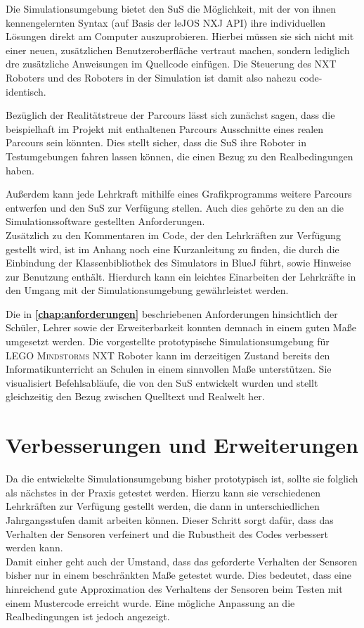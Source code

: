\documentclass[paper=a4, DIV=calc, BCOR=12mm, twoside=on, onecolumn=on, open = right, titlepage =on, parskip =half-, headsepline = on, footsepline = off, chapterprefix = off, appendixprefix = on, fontsize = 12pt, numbers = noenddot, abstract = on]{scrbook}
\begin{document}
Die Simulationsumgebung bietet den SuS die Möglichkeit, mit der von ihnen kennengelernten Syntax (auf Basis der leJOS NXJ API) ihre individuellen Lösungen direkt am Computer auszuprobieren. Hierbei müssen sie sich nicht mit einer neuen, zusätzlichen Benutzeroberfläche vertraut machen, sondern lediglich dre zusätzliche Anweisungen im Quellcode einfügen. Die Steuerung des NXT Roboters und des Roboters in der Simulation ist damit also nahezu code-identisch.

Bezüglich der Realitätstreue der Parcours lässt sich zunächst sagen, dass die beispielhaft im Projekt mit enthaltenen Parcours Ausschnitte eines realen Parcours sein könnten. Dies stellt sicher, dass die SuS ihre Roboter in Testumgebungen fahren lassen können, die einen Bezug zu den Realbedingungen haben.

Außerdem kann jede Lehrkraft mithilfe eines Grafikprogramms weitere Parcours entwerfen und den SuS zur Verfügung stellen. Auch dies gehörte zu den an die Simulationssoftware gestellten Anforderungen.\\ 
Zusätzlich zu den Kommentaren im Code, der den Lehrkräften zur Verfügung gestellt wird, ist im Anhang noch eine Kurzanleitung zu finden, die durch die Einbindung der Klassenbibliothek des Simulators in BlueJ führt, sowie Hinweise zur Benutzung enthält. Hierdurch kann ein leichtes Einarbeiten der Lehrkräfte in den Umgang mit der Simulationsumgebung gewährleistet werden. 

Die in \textbf{\ref{chap:anforderungen}} beschriebenen Anforderungen hinsichtlich der Schüler, Lehrer sowie der Erweiterbarkeit konnten demnach in einem guten Maße umgesetzt werden. Die vorgestellte prototypische Simulationsumgebung für \textsc{LEGO Mindstorms} NXT Roboter kann im derzeitigen Zustand bereits den Informatikunterricht an Schulen in einem sinnvollen Maße unterstützen. Sie visualisiert Befehlsabläufe, die von den SuS entwickelt wurden und stellt gleichzeitig den Bezug zwischen Quelltext und Realwelt her. 

\section{Verbesserungen und Erweiterungen}

Da die entwickelte Simulationsumgebung bisher prototypisch ist, sollte sie folglich als nächstes in der Praxis getestet werden. Hierzu kann sie verschiedenen Lehrkräften zur Verfügung gestellt werden, die dann in unterschiedlichen Jahrgangsstufen damit arbeiten können. Dieser Schritt sorgt dafür, dass das Verhalten der Sensoren verfeinert und die Rubustheit des Codes verbessert werden kann.\\
Damit einher geht auch der Umstand, dass das geforderte Verhalten der Sensoren bisher nur in einem beschränkten Maße getestet wurde. Dies bedeutet,
dass eine hinreichend gute Approximation des Verhaltens der Sensoren beim
Testen mit einem Mustercode erreicht wurde. Eine mögliche Anpassung an die Realbedingungen ist jedoch angezeigt.
\end{document}
